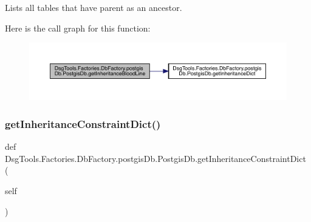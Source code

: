 \begin{DoxyVerb}Lists all tables that have parent as an ancestor.
\end{DoxyVerb}
 Here is the call graph for this function\+:
\nopagebreak
\begin{figure}[H]
\begin{center}
\leavevmode
\includegraphics[width=350pt]{class_dsg_tools_1_1_factories_1_1_db_factory_1_1postgis_db_1_1_postgis_db_ac90cfbc458f443c776716d93804e19a1_cgraph}
\end{center}
\end{figure}
\mbox{\label{class_dsg_tools_1_1_factories_1_1_db_factory_1_1postgis_db_1_1_postgis_db_a29ffcba875e47469dd6de1c3c0ddfd25}} 
\subsubsection{\texorpdfstring{get\+Inheritance\+Constraint\+Dict()}{getInheritanceConstraintDict()}}
{\footnotesize\ttfamily def Dsg\+Tools.\+Factories.\+Db\+Factory.\+postgis\+Db.\+Postgis\+Db.\+get\+Inheritance\+Constraint\+Dict (\begin{DoxyParamCaption}\item[{}]{self }\end{DoxyParamCaption})}

